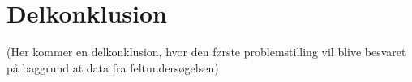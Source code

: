 \chapter{Delkonklusion}
\label{ParametreDelKonklusion}
(Her kommer en delkonklusion, hvor den første problemstilling vil blive besvaret på baggrund at data fra feltundersøgelsen)